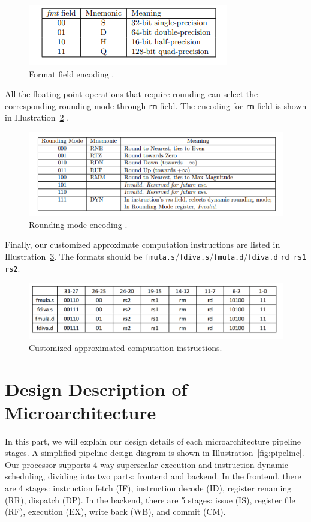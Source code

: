 \begin{figure}[!htp]
    \centering
    \includegraphics[width=0.5\linewidth]{figure/fmt.png}
    \caption{Format field encoding .}
    \label{fig:format field enconding}
\end{figure}

All the floating-point operations that require rounding can select the corresponding rounding mode through \texttt{rm} field. The encoding for \texttt{rm} field is shown in Illustration~\ref{fig:rounding mode encoding} .
\begin{figure}[!htp]
    \centering
    \includegraphics[width=0.8\linewidth]{figure/rm-encoding.png}
    \caption{Rounding mode encoding .}
    \label{fig:rounding mode encoding}
\end{figure}

Finally, our customized approximate computation instructions are listed in Illustration~\ref{fig:customized approximated computation instructions}. The formats should be \texttt{fmula.s}/\texttt{fdiva.s}/\texttt{fmula.d}/\texttt{fdiva.d} \texttt{rd rs1 rs2}. 
\begin{figure}[!htp]
    \centering
    \includegraphics[width=0.8\linewidth]{figure/instruction.png}
    \caption{Customized approximated computation instructions.}
    \label{fig:customized approximated computation instructions}
\end{figure}

\section{Design Description of Microarchitecture}
In this part, we will explain our design details of each microarchitecture pipeline stages. A simplified pipeline design diagram is shown in Illustration~\ref{fig:pipeline}. Our processor supports 4-way superscalar execution and instruction dynamic scheduling, dividing into two parts: frontend and backend. In the frontend, there are 4 stages: instruction fetch (IF), instruction decode (ID), register renaming (RR), dispatch (DP). In the backend, there are 5 stages: issue (IS), register file (RF), execution (EX), write back (WB), and commit (CM).

